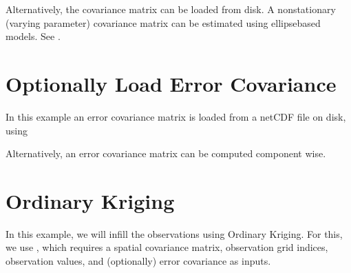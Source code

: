 \documentclass[letterpaper,10pt,english]{sphinxmanual}
\begin{document}
\sphinxAtStartPar
Alternatively, the covariance matrix can be loaded from disk. A non\sphinxhyphen{}stationary (varying parameter)
covariance matrix can be estimated using ellipse\sphinxhyphen{}based models. See
{\hyperref[\detokenize{ellipse:glomar_gridding.ellipse.EllipseModel}]{}}.


\section{Optionally Load Error Covariance}
\label{\detokenize{workflow:optionally-load-error-covariance}}
\sphinxAtStartPar
In this example an error covariance matrix is loaded from a netCDF file on disk, using
{\hyperref[\detokenize{misc:glomar_gridding.io.load_array}]{}}

\begin{sphinxVerbatim}[commandchars=\\\{\}]
   
\end{sphinxVerbatim}

\sphinxAtStartPar
Alternatively, an error covariance matrix can be computed component wise.


\section{Ordinary Kriging}
\label{\detokenize{workflow:ordinary-kriging}}
\sphinxAtStartPar
In this example, we will infill the observations using Ordinary Kriging. For this, we use
{\hyperref[\detokenize{kriging:glomar_gridding.kriging.OrdinaryKriging}]{}}, which requires a spatial covariance matrix,
observation grid indices, observation values, and (optionally) error covariance as inputs.

\begin{sphinxVerbatim}[commandchars=\\\{\}]
  
\end{sphinxVerbatim}
\end{document}

